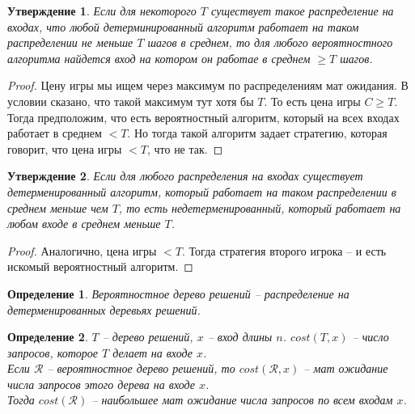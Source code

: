 \documentclass[12pt, letterpaper]{article}
\newtheorem{prop}{Утверждение}[section]
\newtheorem{defi}{Определение}[section]
\begin{document}
\begin{prop}
Если для некоторого $T$ существует такое распределение на входах, что любой детерминированный алгоритм работает на таком распределении не меньше $T$ шагов в среднем, то для любого вероятностного алгоритма найдется вход на котором он работае в среднем $\geq T$ шагов.
\end{prop}
\begin{proof}
Цену игры мы ищем через максимум по распределениям мат ожидания. В условии сказано, что такой максимум тут хотя бы $T$. То есть цена игры $C \geq T$. Тогда предположим, что есть вероятностный алгоритм, который на всех входах работает в среднем $< T$. Но тогда такой алгоритм задает стратегию, которая говорит, что цена игры $<T$, что не так.  
\end{proof}

\begin{prop}
Если для любого распределения на входах существует детерменированный алгоритм, который работает на таком распределении в среднем меньше чем $T$, то есть недетерменированный, который работает на любом входе в среднем меньше $T$.
\end{prop}
\begin{proof}
Аналогично, цена игры $<T$. Тогда стратегия второго игрока -- и есть искомый вероятностный алгоритм.
\end{proof}

\begin{defi}
Вероятностное дерево решений -- распределение на детерменированных деревьях решений.
\end{defi}

\begin{defi}
$T$ -- дерево решений, $x$ -- вход длины $n$. $cost(T,x)$ -- число запросов, которое $T$ делает на входе $x$. \\
Если $\mathcal{R}$ -- вероятностное дерево решений, то $cost(\mathcal{R}, x)$ -- мат ожидание числа запросов этого дерева на входе $x$. \\
Тогда $cost(\mathcal{R})$ -- наибольшее мат ожидание числа запросов по всем входам $x$.
\end{defi}
\end{document}
